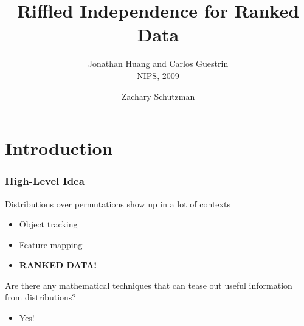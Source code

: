 \documentclass{beamer} %
\title{Riffled Independence for Ranked Data}
\subtitle{Jonathan Huang and Carlos Guestrin \\ NIPS, 2009}
\author{Zachary Schutzman}
\institute{University of Pennsylvania}
\theoremstyle{definition} %
\def \pausenl {\pause $ \ $\\}
\begin{document}
\begin{frame} 
\titlepage
\end{frame}

\section{Introduction}

\begin{frame}
	\frametitle{High-Level Idea}
	
	\pause
	Distributions over permutations show up in a lot of contexts
	\pause
	\begin{itemize}
		\item Object tracking
		\item Feature mapping
		\item \textbf{RANKED DATA!}
	\end{itemize}
	\pausenl
	
	Are there any mathematical techniques that can tease out useful information from distributions?
	\pausenl
	
	\begin{itemize}
		\item Yes!
	\end{itemize}
	
	
	
	
\end{frame}
\end{document}
